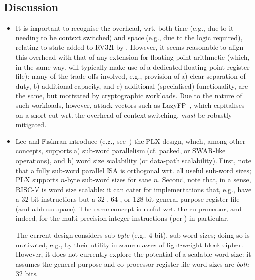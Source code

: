 
\subsection{Discussion}
\label{sec:bg:discussion}

\begin{itemize}

\item It is important to recognise 
      the overhead, wrt. both 
      time (e.g., due to it needing to be context switched) 
      and 
      space (e.g., due to the logic required),
      relating to state added to RV32I by \XCID.
      However, it seems reasonable to align this overhead with that of any
      extension for floating-point arithmetic (which, in the same way, will
      typically make use of a dedicated floating-point register file): many 
      of the trade-offs involved, e.g., provision of
      a) clear separation of duty,
      b) additional capacity,
         and
      c) additional (specialised) functionality,
      are the same, but motivated by cryptographic workloads.
      Due to the nature of such workloads, however, attack vectors such as
      LazyFP~\cite{SCARV:StePre:18}, which capitalises on a short-cut wrt. 
      the overhead of context switching, {\em must} be robustly mitigated.

\item Lee and Fiskiran introduce (e.g., see~\cite{SCARV:LeeFis:05}) the PLX
      design, which, among other concepts, supports 
      a) sub-word parallelism (cf. packed, or SWAR-like operations),
         and
      b) word size scalability (or data-path scalability).
      First, 
      note that a fully sub-word parallel ISA is orthogonal wrt. all useful
      sub-word sizes; PLX supports $n$-byte sub-word sizes for sane $n$.
      Second,
      note that, in a sense, RISC-V is word size scalable: it can cater for
      implementations that, e.g., have a $32$-bit instructions but a $32$-,
      $64$-, or $128$-bit general-purpose register file (and address space).
      The same concept is useful wrt. the co-processor, and indeed, for the
      multi-precision integer instructions 
      (per )
      in particular.

      The current design considers sub-{\em byte} (e.g., $4$-bit), sub-word
      sizes; doing so is motivated, e.g., by their utility in some classes 
      of light-weight block cipher.  However, it does not currently explore 
      the potential of a scalable word size: it assumes the general-purpose
      and co-processor register file word sizes are {\em both} $32$ bits.


\end{itemize}

